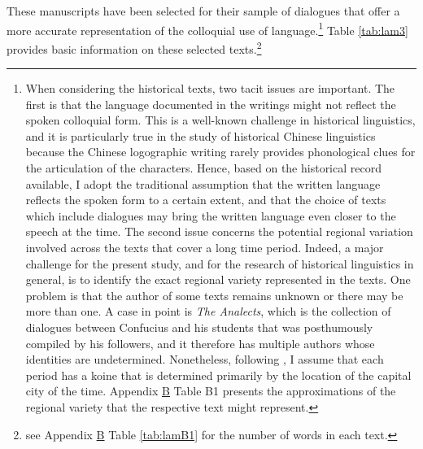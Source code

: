 \documentclass[output=paper]{langscibook}
\begin{document}
These manuscripts have been selected for their sample of dialogues that offer a more accurate representation of the colloquial use of language.\footnote{When considering the historical texts, two tacit issues are important. The first is that the language documented in the writings might not reflect the spoken colloquial form. This is a well-known challenge in historical linguistics, and it is particularly true in the study of historical Chinese linguistics because the Chinese logographic writing rarely provides phonological clues for the articulation of the characters. Hence, based on the historical record available, I adopt the traditional assumption that the written language reflects the spoken form to a certain extent, and that the choice of texts which include dialogues may bring the written language even closer to the speech at the time. The second issue concerns the potential regional variation involved across the texts that cover a long time period. Indeed, a major challenge for the present study, and for the research of historical linguistics in general, is to identify the exact regional variety represented in the texts. One problem is that the author of some texts remains unknown or there may be more than one. A case in point is \emph{The Analects}, which is the collection of dialogues between Confucius and his students that was posthumously compiled by his followers, and it therefore has multiple authors whose identities are undetermined. Nonetheless, following \cite{TaiChan1999}, I assume that each period has a koine that is determined primarily by the location of the capital city of the time. Appendix \hyperlink{app:lamB}{B} Table B1 presents the approximations of the regional variety that the respective text might represent.} 
Table \ref{tab:lam3} provides basic information on these selected texts.\footnote{see Appendix \hyperlink{app:lamB}{B} Table \ref{tab:lamB1} for the number of words in each text.} 
\end{document}

